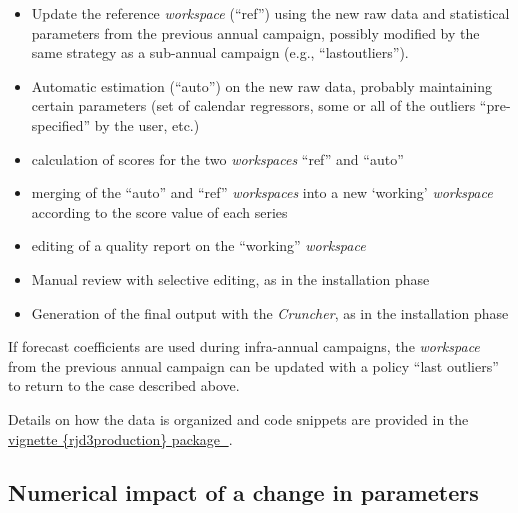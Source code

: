\documentclass[
  letterpaper,
  DIV=11,
  numbers=noendperiod]{scrreprt}
\begin{document}
\begin{itemize}
\item
  Update the reference \emph{workspace} (``ref'') using the new raw data
  and statistical parameters from the previous annual campaign, possibly
  modified by the same strategy as a sub-annual campaign (e.g.,
  ``lastoutliers'').
\item
  Automatic estimation (``auto'') on the new raw data, probably
  maintaining certain parameters (set of calendar regressors, some or
  all of the outliers ``pre-specified'' by the user, etc.)
\item
  calculation of scores for the two \emph{workspaces} ``ref'' and
  ``auto''
\item
  merging of the ``auto'' and ``ref'' \emph{workspaces} into a new
  `working' \emph{workspace} according to the score value of each series
\item
  editing of a quality report on the ``working'' \emph{workspace}
\item
  Manual review with selective editing, as in the installation phase
\item
  Generation of the final output with the \emph{Cruncher}, as in the
  installation phase
\end{itemize}

If forecast coefficients are used during infra-annual campaigns, the
\emph{workspace} from the previous annual campaign can be updated with a
policy ``last outliers'' to return to the case described above.

Details on how the data is organized and code snippets are provided in
the
\href{https://inseefr.github.io/rjd3production/articles/process.html}{vignette
\{rjd3production\} package 🔗}.

\hypertarget{numerical-impact-of-a-change-in-parameters}{%
\subsection*{Numerical impact of a change in
parameters}\label{numerical-impact-of-a-change-in-parameters}}
\end{document}
